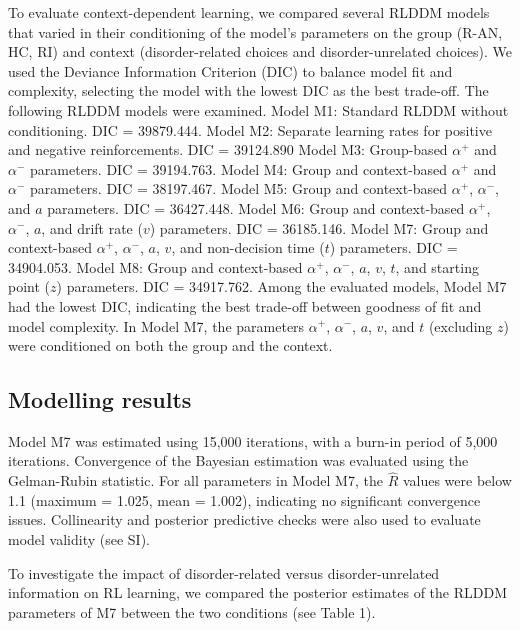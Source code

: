 \documentclass[
  man,floatsintext]{apa6}
\begin{document}
To evaluate context-dependent learning, we compared several RLDDM models that varied in their conditioning of the model's parameters on the group (R-AN, HC, RI) and context (disorder-related choices and disorder-unrelated choices). We used the Deviance Information Criterion (DIC) to balance model fit and complexity, selecting the model with the lowest DIC as the best trade-off. The following RLDDM models were examined. Model M1: Standard RLDDM without conditioning. DIC = 39879.444. Model M2: Separate learning rates for positive and negative reinforcements. DIC = 39124.890 Model M3: Group-based \(\alpha^+\) and \(\alpha^-\) parameters. DIC = 39194.763. Model M4: Group and context-based \(\alpha^+\) and \(\alpha^-\) parameters. DIC = 38197.467. Model M5: Group and context-based \(\alpha^+\), \(\alpha^-\), and \(a\) parameters. DIC = 36427.448. Model M6: Group and context-based \(\alpha^+\), \(\alpha^-\), \(a\), and drift rate (\(v\)) parameters. DIC = 36185.146. Model M7: Group and context-based \(\alpha^+\), \(\alpha^-\), \(a\), \(v\), and non-decision time (\(t\)) parameters. DIC = 34904.053. Model M8: Group and context-based \(\alpha^+\), \(\alpha^-\), \(a\), \(v\), \(t\), and starting point (\(z\)) parameters. DIC = 34917.762. Among the evaluated models, Model M7 had the lowest DIC, indicating the best trade-off between goodness of fit and model complexity. In Model M7, the parameters \(\alpha^+\), \(\alpha^-\), \(a\), \(v\), and \(t\) (excluding \(z\)) were conditioned on both the group and the context.

\hypertarget{modelling-results}{%
\subsection{Modelling results}\label{modelling-results}}

Model M7 was estimated using 15,000 iterations, with a burn-in period of 5,000 iterations. Convergence of the Bayesian estimation was evaluated using the Gelman-Rubin statistic. For all parameters in Model M7, the \(\hat{R}\) values were below 1.1 (maximum = 1.025, mean = 1.002), indicating no significant convergence issues. Collinearity and posterior predictive checks were also used to evaluate model validity (see SI).

To investigate the impact of disorder-related versus disorder-unrelated information on RL learning, we compared the posterior estimates of the RLDDM parameters of M7 between the two conditions (see Table 1).
\end{document}
